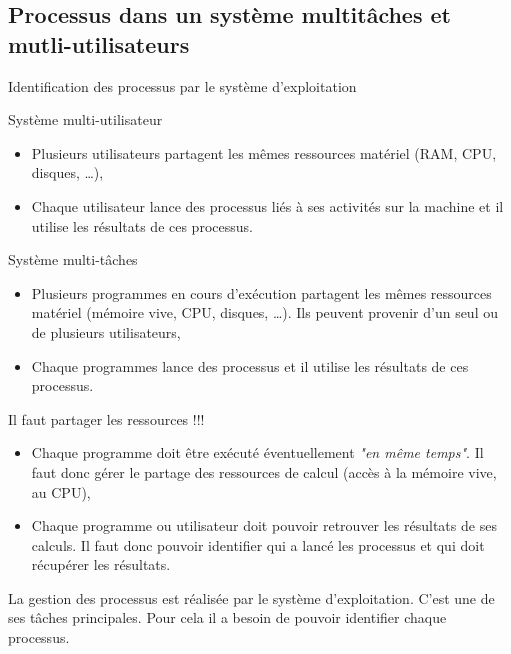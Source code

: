 \subsection{Processus dans un système multitâches et mutli-utilisateurs}
\begin{frame}{Identification des processus par le système
    d'exploitation}
  \begin{block}{Système multi-utilisateur}
    \begin{itemize}
    \item Plusieurs utilisateurs partagent les mêmes ressources matériel
      (RAM, CPU, disques, \dots),
    \item Chaque utilisateur lance des processus liés à ses activités
      sur la machine et il utilise les résultats de ces processus.
    \end{itemize}
  \end{block}
  \begin{block}{Système multi-tâches}
    \begin{itemize}
    \item Plusieurs programmes en cours d'exécution partagent les mêmes
      ressources matériel (mémoire vive, CPU, disques, \dots). Ils
      peuvent provenir d'un seul ou de plusieurs utilisateurs,
    \item Chaque programmes lance des processus et il utilise les
      résultats de ces processus.
    \end{itemize}
  \end{block}
  \begin{alertblock}{Il faut partager les ressources !!!}
    \begin{itemize}
    \item Chaque programme doit être exécuté éventuellement \textit{"en
        même temps"}. Il faut donc gérer le partage des ressources de
      calcul (accès à la mémoire vive, au CPU),
    \item Chaque programme ou utilisateur doit pouvoir retrouver les
      résultats de ses calculs. Il faut donc pouvoir identifier qui a
      lancé les processus et qui doit récupérer les résultats.
    \end{itemize}
    La gestion des processus est réalisée par le système
    d'exploitation. C'est une de ses tâches principales. Pour cela il a
    besoin de pouvoir identifier chaque processus.
  \end{alertblock}
\end{frame}

